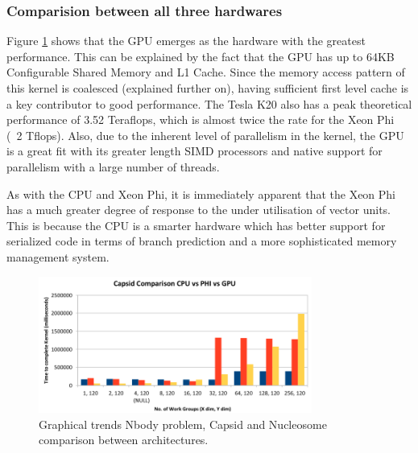 \subsubsection{Comparision between all three hardwares}
\par{{\color{red}Figure \ref{nbody_comp} shows that} the GPU emerges as the hardware with the greatest performance. 
    This can be explained by the fact that the GPU has up to 64KB Configurable Shared Memory and L1 Cache.
    Since the memory access pattern of this kernel is coalesced (explained further on), having sufficient 
    first level cache is a key contributor to good performance. The Tesla K20 also has a peak theoretical 
    performance of 3.52 Teraflops, which is almost twice the rate for the Xeon Phi (~2 Tflops). 
    Also, due to the inherent level of parallelism in the kernel, the GPU is a great fit with 
    its greater length SIMD processors and native support for parallelism with a large number of threads.}

\par{As with the CPU and Xeon Phi, it is immediately apparent that the Xeon Phi 
    has a much greater degree of response to the under utilisation of vector units. 
    This is because the CPU is a smarter hardware which has better support for 
    serialized code in terms of branch prediction and a more sophisticated 
    memory management system.}

\begin{figure}[!h]
    \centering
    \includegraphics[width=0.8\textwidth]{figures/nbody_comp.png}
    \caption{Graphical trends Nbody problem, Capsid and Nucleosome comparison between architectures.}
    \label{nbody_comp}
\end{figure}


